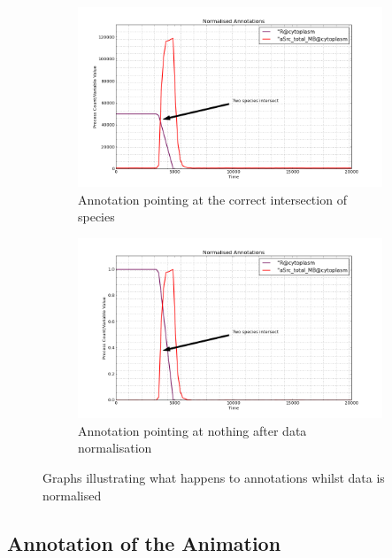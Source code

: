 \begin{figure}[h!]
    \centering
    \begin{subfigure}[b]{0.6\textwidth}
        \centering
        \includegraphics[width=\textwidth]{images/unnormalised_annotation.png}
        \caption{Annotation pointing at the correct intersection of species}
        \label{fig:distance_scale_a}
    \end{subfigure}

    \begin{subfigure}[b]{0.6\textwidth}
        \centering
        \includegraphics[width=\textwidth]{images/normalised_annotation.png}
        \caption{Annotation pointing at nothing after data normalisation}
        \label{fig:distance_scale_b}
    \end{subfigure}
    \caption{Graphs illustrating what happens to annotations whilst data is normalised}
    \label{fig:distance_scale}
\end{figure}

\subsection{Annotation of the Animation}
\label{sec:anime_annotation}

